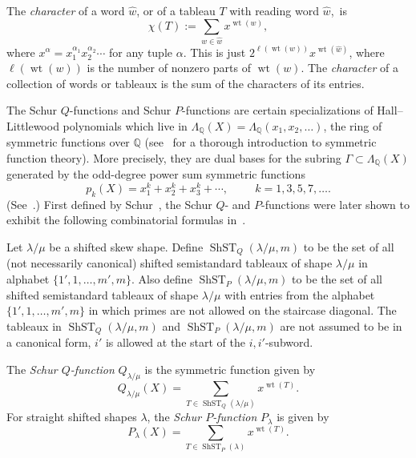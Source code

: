 \documentclass[ALCO,ThmDefs,Unicode,epreuves]{cedram}
\newcommand{\QQ}{\mathbb{Q}}
\DeclareMathOperator{\ShST}{ShST}
\DeclareMathOperator{\wt}{wt}
\begin{document}
\begin{defi}
The \emph{character} of a word $\hat{w}$, or of a tableau $T$ with reading word $\hat{w}$,~is 
\[
\chi(T):=\sum_{w\in \hat{w}}x^{\wt (w)},
\] 
where $x^{\alpha}=x_1^{\alpha_1}x_2^{\alpha_2}\cdots $ for any tuple $\alpha$. This is just $2^{\ell(\wt (w))}x^{\wt (\hat{w})}$, where $\ell(\wt (w))$ is the number of nonzero parts of $\wt (w)$. The \emph{character} of a collection of words or tableaux is the sum of the characters of its entries. 
\end{defi}

The Schur $Q$-functions and Schur $P$-functions are certain specializations of Hall--Littlewood polynomials which live in $\Lambda_{\mathbb{Q}}(X)=\Lambda_{\mathbb{Q}}(x_1,x_2,\ldots)$, the ring of symmetric functions over $\mathbb{Q}$ (see~\cite{Macdonald} for a thorough introduction to symmetric function theory). More precisely, they are dual bases for the subring $\Gamma\subset \Lambda_{\QQ}(X)$ generated by the odd-degree power sum symmetric functions 
\[
p_k(X)=x_1^k+x_2^k+x_3^k+\cdots,\hspace{1cm} k=1,3,5,7,\ldots.
\]
 (See~\cite{Stembridge}.) First defined by Schur~\cite{Schur}, the Schur $Q$- and $P$-functions were later shown to exhibit the following combinatorial formulas in~\cite{Stembridge}.

\begin{defi}
Let $\lambda/\mu$ be a shifted skew shape. Define $\ShST_Q(\lambda/\mu,m)$ to be the set of all (not necessarily canonical) shifted semistandard tableaux of shape $\lambda/\mu$ in alphabet $\{1',1,\ldots,m',m\}$. 
Also define $\ShST_P(\lambda/\mu,m)$ to be the set of all shifted semistandard tableaux of shape $\lambda/\mu$ with entries from the alphabet $\{1',1,\ldots,m',m\}$ in which primes are not allowed on the staircase diagonal.
The tableaux in $\ShST_Q(\lambda/\mu,m)$ and $\ShST_P(\lambda/\mu,m)$ are not assumed to be in a canonical form, \ie $i'$ is allowed at the start of the $i,i'$-subword.
\end{defi}

\begin{defi}\label{def:SchurQ}
The \emph{Schur $Q$-function} $Q_{\lambda/\mu}$ is the symmetric function given by 
\[
Q_{\lambda/\mu}(X)=\sum_{T\in \ShST_Q(\lambda/\mu)} x^{\wt (T)}.
\]
For straight shifted shapes $\lambda$, the \emph{Schur $P$-function} $P_{\lambda}$ is given by 
\[
P_{\lambda}(X)=\sum_{T\in \ShST_P(\lambda)} x^{\wt (T)}.
\]
\end{defi}
\end{document}
